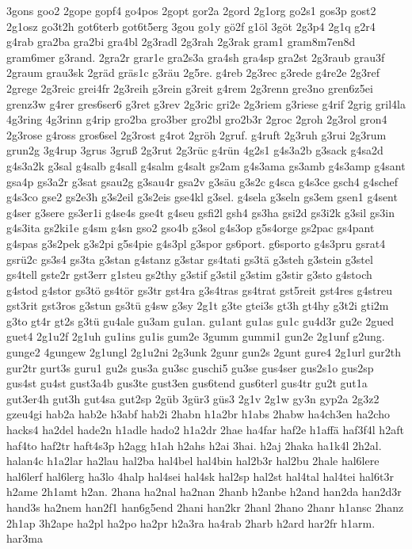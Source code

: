 {3gons
goo2
2gope
gopf4
go4pos
2gopt
gor2a
2gord
2g1org
go2s1
gos3p
gost2
2g1osz
go3t2h
got6terb
got6t5erg
3gou
go1y
gö2f
g1öl
3göt
2g3p4
2g1q
g2r4
g4rab
gra2ba
gra2bi
gra4bl
2g3radl
2g3rah
2g3rak
gram1
gram8m7en8d
gram6mer
g3rand.
2gra2r
grar1e
gra2s3a
gra4sh
gra4sp
gra2st
2g3raub
grau3f
2graum
grau3sk
2gräd
gräs1c
g3räu
2g5re.
g4reb
2g3rec
g3rede
g4re2e
2g3ref
2grege
2g3reic
grei4fr
2g3reih
g3rein
g3reit
g4rem
2g3renn
gre3no
gren6z5ei
grenz3w
g4rer
gres6ser6
g3ret
g3rev
2g3ric
gri2e
2g3riem
g3riese
g4rif
2grig
gril4la
4g3ring
4g3rinn
g4rip
gro2ba
gro3ber
gro2bl
gro2b3r
2groc
2groh
2g3rol
gron4
2g3rose
g4ross
gros6sel
2g3rost
g4rot
2gröh
2gruf.
g4ruft
2g3ruh
g3rui
2g3rum
grun2g
3g4rup
3grus
3gruß
2g3rut
2g3rüc
g4rün
4g2s1
g4s3a2b
g3sack
g4sa2d
g4s3a2k
g3sal
g4salb
g4sall
g4salm
g4salt
gs2am
g4s3ama
gs3amb
g4s3amp
g4sant
gsa4p
gs3a2r
g3sat
gsau2g
g3sau4r
gsa2v
g3säu
g3s2c
g4sca
g4s3ce
gsch4
g4schef
g4s3co
gse2
gs2e3h
g3s2eil
g3s2eis
gse4kl
g3sel.
g4sela
g3seln
gs3em
gsen1
g4sent
g4ser
g3sere
gs3er1i
g4se4s
gse4t
g4seu
gsfi2l
gsh4
gs3ha
gsi2d
gs3i2k
g3sil
gs3in
g4s3ita
gs2ki1e
g4sm
g4sn
gso2
gso4b
g3sol
g4s3op
g5s4orge
gs2pac
gs4pant
g4spas
g3s2pek
g3s2pi
g5s4pie
g4s3pl
g3spor
gs6port.
g6sporto
g4s3pru
gsrat4
gsrü2c
gs3s4
gs3ta
g3stan
g4stanz
g3star
gs4tati
gs3tä
g3steh
g3stein
g3stel
gs4tell
gste2r
gst3err
g1steu
gs2thy
g3stif
g3stil
g3stim
g3stir
g3sto
g4stoch
g4stod
g4stor
gs3tö
gs4tör
gs3tr
gst4ra
g3s4tras
gs4trat
gst5reit
gst4res
g4streu
gst3rit
gst3ros
g3stun
gs3tü
g4sw
g3sy
2g1t
g3te
gtei3s
gt3h
gt4hy
g3t2i
gti2m
g3to
gt4r
gt2s
g3tü
gu4ale
gu3am
gu1an.
gu1ant
gu1as
gu1c
gu4d3r
gu2e
2gued
guet4
2g1u2f
2g1uh
gu1ins
gu1is
gum2e
3gumm
gummi1
gun2e
2g1unf
g2ung.
gunge2
4gungew
2g1ungl
2g1u2ni
2g3unk
2gunr
gun2s
2gunt
gure4
2g1url
gur2th
gur2tr
gurt3s
guru1
gu2s
gus3a
gu3sc
guschi5
gu3se
gus4ser
gus2s1o
gus2sp
gus4st
gu4st
gust3a4b
gus3te
gust3en
gus6tend
gus6terl
gus4tr
gu2t
gut1a
gut3er4h
gut3h
gut4sa
gut2sp
2güb
3gür3
güs3
2g1v
2g1w
gy3n
gyp2a
2g3z2
gzeu4gi
hab2a
hab2e
h3abf
hab2i
2habn
h1a2br
h1abs
2habw
ha4ch3en
ha2cho
hacks4
ha2del
hade2n
h1adle
hado2
h1a2dr
2hae
ha4far
haf2e
h1affä
haf3f4l
h2aft
haf4to
haf2tr
haft4s3p
h2agg
h1ah
h2ahs
h2ai
3hai.
h2aj
2haka
ha1k4l
2h2al.
halan4c
h1a2lar
ha2lau
hal2ba
hal4bel
hal4bin
hal2b3r
hal2bu
2hale
hal6lere
hal6lerf
hal6lerg
ha3lo
4halp
hal4sei
hal4sk
hal2sp
hal2st
hal4tal
hal4tei
hal6t3r
h2ame
2h1amt
h2an.
2hana
ha2nal
ha2nan
2hanb
h2anbe
h2and
han2da
han2d3r
hand3s
ha2nem
han2f1
han6g5end
2hani
han2kr
2hanl
2hano
2hanr
h1ansc
2hanz
2h1ap
3h2ape
ha2pl
ha2po
ha2pr
h2a3ra
ha4rab
2harb
h2ard
har2fr
h1arm.
har3ma
}
